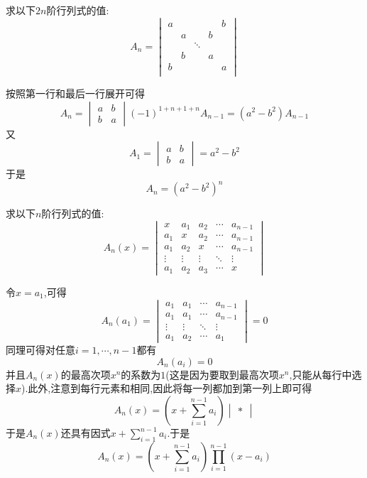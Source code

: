 \documentclass{ctexart}
\begin{document}
\begin{problem}
    求以下$2n$阶行列式的值:
    \[A_n=\begin{vmatrix}
        a&&&&b\\
        &a&&b&\\
        &&\ddots&&\\
        &b&&a&\\
        b&&&&a\\
    \end{vmatrix}\]
\end{problem}
\begin{solution}
    按照第一行和最后一行展开可得
    \[A_n=\begin{vmatrix}
        a&b\\b&a
    \end{vmatrix}(-1)^{1+n+1+n}A_{n-1}=\left(a^2-b^2\right)A_{n-1}\]
    又
    \[A_1=\begin{vmatrix}
        a&b\\b&a
    \end{vmatrix}=a^2-b^2\]
    于是
    \[A_n=\left(a^2-b^2\right)^n\]
\end{solution}
\begin{problem}
    求以下$n$阶行列式的值:
    \[A_n(x)=\begin{vmatrix}
        x&a_1&a_2&\cdots&a_{n-1}\\
        a_1&x&a_2&\cdots&a_{n-1}\\
        a_1&a_2&x&\cdots&a_{n-1}\\
        \vdots&\vdots&\vdots&\ddots&\vdots\\
        a_1&a_2&a_3&\cdots&x
    \end{vmatrix}\]
\end{problem}
\begin{solution}
    令$x=a_1$,可得
    \[A_n\left(a_1\right)=\begin{vmatrix}
        a_1&a_1&\cdots&a_{n-1}\\
        a_1&a_1&\cdots&a_{n-1}\\
        \vdots&\vdots&\ddots&\vdots\\
        a_1&a_2&\cdots&a_1
    \end{vmatrix}=0\]
    同理可得对任意$i=1,\cdots,n-1$都有
    \[A_n\left(a_i\right)=0\]
    并且$A_n(x)$的最高次项$x^n$的系数为$1$(这是因为要取到最高次项$x^n$,只能从每行中选择$x$).此外,注意到每行元素和相同,因此将每一列都加到第一列上即可得
    \[A_n(x)=\left(x+\sum_{i=1}^{n-1}a_i\right)\begin{vmatrix}
        \ast
    \end{vmatrix}\]
    于是$A_n(x)$还具有因式$\displaystyle x+\sum_{i=1}^{n-1}a_i$.于是
    \[A_n(x)=\left(x+\sum_{i=1}^{n-1}a_i\right)\prod_{i=1}^{n-1}\left(x-a_i\right)\]
\end{solution}
\end{document}

